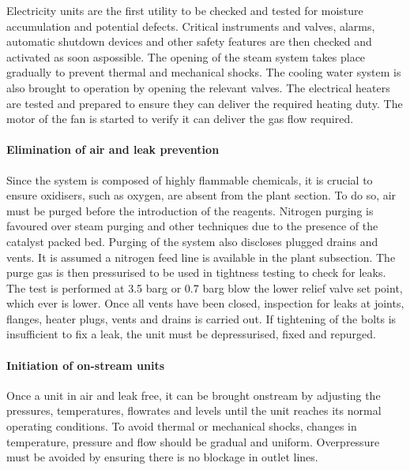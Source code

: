 Electricity units are the first utility to be checked and tested for moisture accumulation and potential defects. Critical instruments and valves, alarms, automatic shutdown devices and other safety features are then checked and activated as soon aspossible.
The opening of the steam system takes place gradually to prevent thermal and mechanical shocks. The cooling water system is also brought to operation by opening the relevant valves. The electrical heaters are tested and prepared to ensure they can deliver the required heating duty. The motor of the fan is started to verify it can deliver the gas flow required. 

\paragraph{Elimination of air and leak prevention}
Since the system is composed of highly flammable chemicals, it is crucial to ensure oxidisers, such as oxygen, are absent from the plant section. To do so, air must be purged before the introduction of the reagents. Nitrogen purging is favoured over steam purging and other techniques due to the presence of the catalyst packed bed. Purging of the system also discloses plugged drains and vents. It is assumed a nitrogen feed line is available in the plant subsection. 
The purge gas is then pressurised to be used in tightness testing to check for leaks. The test is performed at 3.5 barg or 0.7 barg blow the lower relief valve set point, which ever is lower. Once all vents have been closed, inspection for leaks at joints, flanges, heater plugs, vents and drains is carried out. If tightening of the bolts is insufficient to fix a leak, the unit must be depressurised, fixed and repurged.

\paragraph{Initiation of on-stream units}
Once a unit in air and leak free, it can be brought onstream by adjusting the pressures, temperatures, flowrates and levels until the unit reaches its normal operating conditions. To avoid thermal or mechanical shocks, changes in temperature, pressure and flow should be gradual and uniform. Overpressure must be avoided by ensuring there is no blockage in outlet lines.


